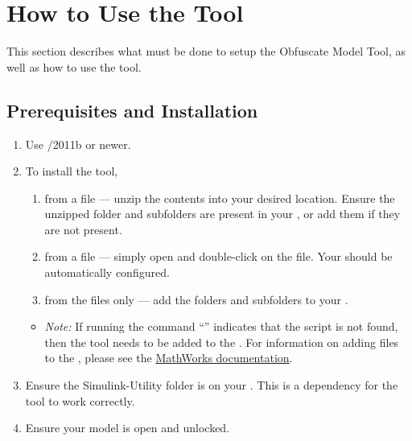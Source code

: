 \documentclass{article}
\makeatletter
\newcommand{\ToolName}{Obfuscate Model Tool\@\xspace}
\makeatother
\begin{document}
\section{How to Use the Tool}
This section describes what must be done to setup the \ToolName, as well as how to use the tool.

\subsection{Prerequisites and Installation}

\begin{enumerate}
  \item Use \Matlab/\Simulink 2011b or newer.
	\item To install the tool,
	\begin{enumerate}
		\item from a  file --- unzip the contents into your desired location. Ensure the unzipped folder and subfolders are present in your \mpath, or add them if they are not present.
		\item from a  file --- simply open \Matlab and double-click on the file. Your \mpath should be automatically configured.
		\item from the files only --- add the folders and subfolders to your \mpath. %
	\end{enumerate}
	\begin{itemize}
		\item \textit{Note:} If running the command ``'' indicates that the script is not found, then the tool needs to be added to the \mpath.
		For information on adding files to the \mpath, please see the \href{https://www.mathworks.com/help/matlab/matlab_env/add-remove-or-reorder-folders-on-the-search-path.html}{MathWorks documentation}.
	\end{itemize}
	\item Ensure the Simulink-Utility folder is on your \mpath. This is a dependency for the tool to work correctly.
	\item Ensure your model is open and unlocked.
\end{enumerate}
\end{document}
